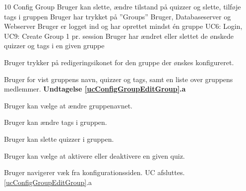\uchead
	{10} %
	{Config Group} %
	{Bruger kan slette, ændre tilstand på quizzer og slette, tilføje tags i gruppen} %
	{Bruger har trykket på ''Groups''} %
	{Bruger, Databaseserver og Webserver} %
	{Bruger er logget ind og har oprettet mindst én gruppe}
	{UC6: Login, UC9: Create Group} %
	{1 pr. session} %
	{Bruger har ændret eller slettet de ønskede quizzer og tags i en given gruppe} %


\item Bruger trykker på redigeringsikonet for den gruppe der ønskes konfigureret.

\item\label{ucConfigGroupEditGroup} Bruger for vist gruppens navn, quizzer og tags, samt en liste over gruppens medlemmer. 
\textbf{Undtagelse \ref{ucConfigGroupEditGroup}.a}

\item Bruger kan vælge at ændre gruppenavnet.

\item Bruger kan ændre tags i gruppen.

\item Bruger kan slette quizzer i gruppen.

\item Bruger kan vælge at aktivere eller deaktivere en given quiz.


\ucdescriptionend %

\ucextension
	{Bruger navigerer væk fra konfigurationssiden.}
	{UC afsluttes.}
	{\ref{ucConfigGroupEditGroup}.a}

